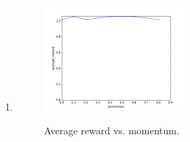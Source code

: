 \documentclass{article}
\newcommand*{\0}{\Vec{0}}
\begin{document}
\begin{enumerate}
\begin{enumerate}
\begin{figure}[H]
					\label{fig:learning_rate}
				\end{figure}

				Generally, in Figure~\ref{fig:learning_rate} we see average reward increase as the learning rate or amount we move the parameters in the direction of the gradient decrease.
				However, as the learning rate decreased, the training time or the time it took the average reward to stabilize was substantially greater.
				No divergence in average reward occurred at the higher learning rates.
			\item
				\begin{figure}[H]
					\centering
					\caption{Average reward vs. momentum.}
					\includegraphics[width=0.5\textwidth]{fig/momentum.png}
					\label{fig:momentum}
				\end{figure}

\end{enumerate}
\end{enumerate}
\end{document}
